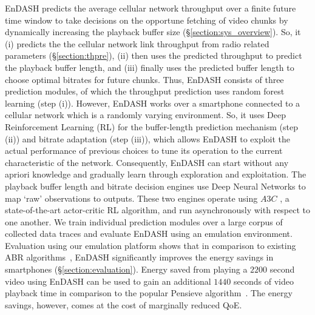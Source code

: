 EnDASH predicts the average cellular network throughput over a finite future time window to take decisions on the opportune fetching of video chunks by dynamically increasing the playback buffer size (\S\ref{section:sys_overview}). So, it (i) predicts the the cellular network link throughput from radio related parameters (\S\ref{section:thpre}), (ii) then uses the predicted throughput to predict the playback buffer length, and (iii) finally uses the predicted buffer length to choose optimal bitrates for future chunks. Thus, EnDASH consists of three prediction modules, of which the throughput prediction uses random forest learning (step (i)). However, EnDASH works over a smartphone connected to a cellular network which is a randomly varying environment. So, it uses Deep Reinforcement Learning (RL) for the buffer-length prediction mechanism (step (ii)) and bitrate adaptation (step (iii)), which allows EnDASH to exploit the actual performance of previous choices to tune its operation to the current characteristic of the network.  Consequently, EnDASH can start without any apriori knowledge and gradually learn through exploration and exploitation.  The playback buffer length and bitrate decision engines use Deep Neural Networks to map `raw' observations to outputs. These two engines operate using $A3C$ \cite{mao2017neural}, a state-of-the-art actor-critic RL algorithm, and run asynchronously with respect to one another. We train individual prediction modules over a large corpus of collected data traces and evaluate EnDASH using an emulation environment.\\
\indent Evaluation using our emulation platform shows that in comparison to existing \ac{ABR} algorithms~\cite{mao2017neural,Spiteri2016,Yin2015}, EnDASH significantly improves the energy savings in smartphones (\S\ref{section:evaluation}). Energy saved from playing a $2200$ second video using EnDASH can be used to gain an additional $1440$ seconds of video playback time in comparison to the popular Pensieve algorithm~\cite{mao2017neural}. The energy savings, however, comes at the cost of marginally reduced \ac{QoE}.
